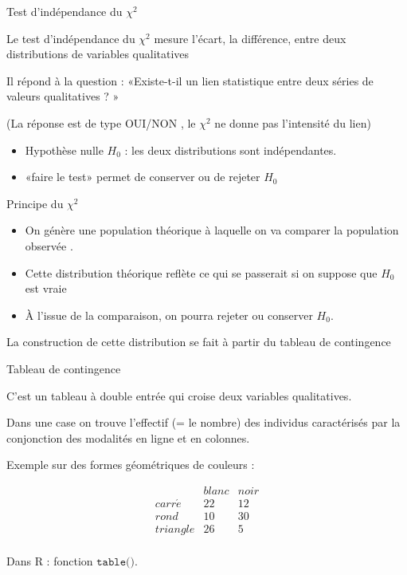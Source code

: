 \documentclass{beamer}
\begin{document}
\begin{frame}{Test d'indépendance du $\chi ^2$}



Le test d'indépendance du $\chi ^2$  mesure l'\alert{écart}, la différence,  entre deux distributions de variables \alert{qualitatives}  

Il répond à la question : «Existe-t-il un lien statistique entre deux séries de valeurs qualitatives ? »  

(La réponse est de type  OUI/NON , le $\chi^2$ ne donne pas l'\alert{intensité} du lien)

\begin{itemize}
\item Hypothèse nulle $H_0$ : les deux distributions sont indépendantes.
\item «faire le test» permet de conserver ou de rejeter $H_0$
\end{itemize}

\end{frame}

\begin{frame}{Principe du $\chi ^2$}



\begin{itemize}
\item  On génère une \alert{population théorique} à laquelle on va comparer la \alert{population observée} .
\item Cette distribution théorique reflète ce qui se passerait si on suppose que $H_0$ est vraie 
\item À l'issue de la comparaison,  on pourra rejeter ou conserver $H_0$.
\end{itemize}

La construction de cette distribution se fait à partir du \alert{tableau de contingence}


\end{frame}

\begin{frame}{ Tableau de contingence}

C'est un tableau à double entrée qui croise deux \alert{variables qualitatives}. 


Dans une case on trouve l'\alert{effectif} (= le nombre) des individus caractérisés par la conjonction des modalités en ligne et en colonnes.


Exemple sur des formes géométriques de couleurs :

$$\begin{array}{c|c|c}
   & blanc & noir \\ 
   \hline
carr\acute{e} &  22 &   12 \\ 
  \hline
  rond &   10 &  30 \\ 
    \hline
  triangle &  26 &   5 \\ 
\end{array}$$


Dans R : fonction $\texttt{table()}$.



\end{frame}
\end{document}
